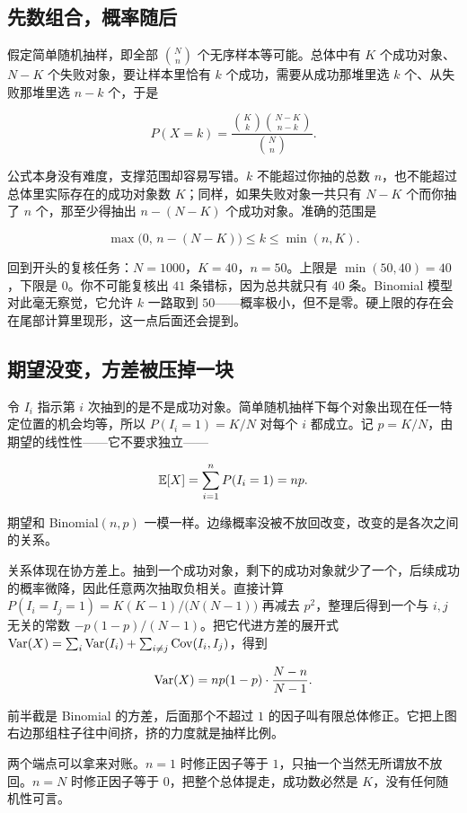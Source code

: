 \subsection{先数组合，概率随后}

假定简单随机抽样，即全部 \(\binom Nn\) 个无序样本等可能。总体中有 \(K\) 个成功对象、\(N-K\) 个失败对象，要让样本里恰有 \(k\) 个成功，需要从成功那堆里选 \(k\) 个、从失败那堆里选 \(n-k\) 个，于是

\[
P(X=k)=\frac{\binom Kk\binom{N-K}{n-k}}{\binom Nn}.
\]

公式本身没有难度，支撑范围却容易写错。\(k\) 不能超过你抽的总数 \(n\)，也不能超过总体里实际存在的成功对象数 \(K\)；同样，如果失败对象一共只有 \(N-K\) 个而你抽了 \(n\) 个，那至少得抽出 \(n-(N-K)\) 个成功对象。准确的范围是

\[
\max\bigl(0,\,n-(N-K)\bigr)\le k\le\min(n,K).
\]

回到开头的复核任务：\(N=1000\)，\(K=40\)，\(n=50\)。上限是 \(\min(50,40)=40\)，下限是 \(0\)。你不可能复核出 \(41\) 条错标，因为总共就只有 \(40\) 条。Binomial 模型对此毫无察觉，它允许 \(k\) 一路取到 \(50\)——概率极小，但不是零。硬上限的存在会在尾部计算里现形，这一点后面还会提到。

\subsection{期望没变，方差被压掉一块}

令 \(I_i\) 指示第 \(i\) 次抽到的是不是成功对象。简单随机抽样下每个对象出现在任一特定位置的机会均等，所以 \(P(I_i=1)=K/N\) 对每个 \(i\) 都成立。记 \(p=K/N\)，由期望的线性性——它不要求独立——

\[
\mathbb{E}[X]=\sum_{i=1}^n P(I_i=1)=np.
\]

期望和 Binomial\((n,p)\) 一模一样。边缘概率没被不放回改变，改变的是各次之间的关系。

关系体现在协方差上。抽到一个成功对象，剩下的成功对象就少了一个，后续成功的概率微降，因此任意两次抽取负相关。直接计算 \(P(I_i=I_j=1)=K(K-1)/\bigl(N(N-1)\bigr)\) 再减去 \(p^2\)，整理后得到一个与 \(i,j\) 无关的常数 \(-p(1-p)/(N-1)\)。把它代进方差的展开式 \(\operatorname{Var}(X)=\sum_i\operatorname{Var}(I_i)+\sum_{i\ne j}\operatorname{Cov}(I_i,I_j)\)，得到

\[
\operatorname{Var}(X)=np(1-p)\cdot\frac{N-n}{N-1}.
\]

前半截是 Binomial 的方差，后面那个不超过 \(1\) 的因子叫有限总体修正。它把上图右边那组柱子往中间挤，挤的力度就是抽样比例。

两个端点可以拿来对账。\(n=1\) 时修正因子等于 \(1\)，只抽一个当然无所谓放不放回。\(n=N\) 时修正因子等于 \(0\)，把整个总体提走，成功数必然是 \(K\)，没有任何随机性可言。

